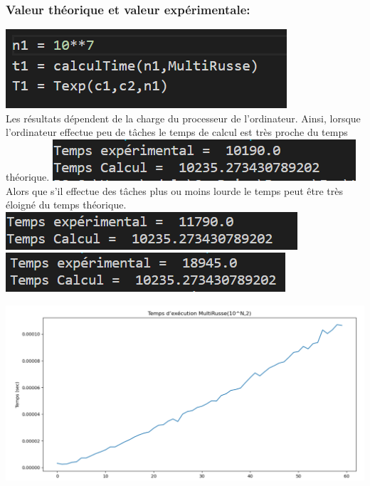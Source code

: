 \documentclass[12pt,a4paper]{report}
\begin{document}
\begin{flushleft}
\subsubsection{Valeur théorique et valeur expérimentale: }
\includegraphics[scale=0.5]{ExpTheo} \\ Les résultats dépendent de la charge du processeur de l'ordinateur. Ainsi, lorsque l'ordinateur effectue peu de tâches le temps de calcul est très proche du temps théorique.
\includegraphics[scale=0.5]{TempGOOD} \\
 Alors que s'il effectue des tâches plus ou moins lourde le temps peut être très éloigné du temps théorique. \\
 \includegraphics[scale=0.5]{TempsNOTGOOD}
 \includegraphics[scale=0.5]{TempsNOTGOODATALL}
 \begin{center}
\begin{minipage}{0.48\linewidth}
\includegraphics[width=\linewidth]{courbeClean}
\end{minipage}%

\end{center}
\end{flushleft}
\end{document}
